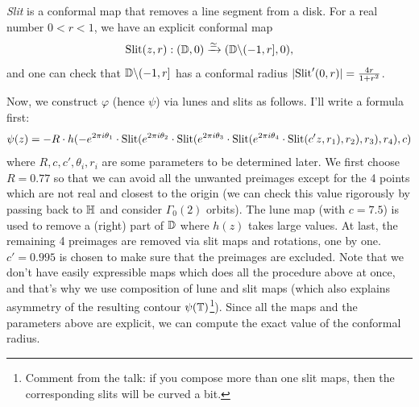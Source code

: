 \emph{Slit} is a conformal map that removes a line segment from a disk.
For a real number $0 < r < 1$, we have an explicit conformal map \cite[Equation A.3.1]{calegari2024linear}
$$
    \mathrm{Slit}(z, r) : (\mathbb{D}, 0) \xrightarrow{\simeq} (\mathbb{D} \backslash (-1, r], 0),
$$
and one can check that $\mathbb{D} \backslash (-1, r]$ has a conformal radius $|\mathrm{Slit}'(0, r)| = \frac{4r}{1 + r^2}$.

Now, we construct $\varphi$ (hence $\psi$) via lunes and slits as follows.
I'll write a formula first:
\begin{equation}
\label{eqn:psi}
    \psi(z) = -R \cdot h(-e^{2\pi i \theta_1} \cdot \mathrm{Slit} (e^{2\pi i \theta_2} \cdot \mathrm{Slit}(e^{2 \pi i \theta_3} \cdot \mathrm{Slit} (e^{2\pi i \theta_4} \cdot \mathrm{Slit} (c' z, r_1), r_2), r_3), r_4), c)
\end{equation}
where $R, c, c', \theta_i, r_i$ are some parameters to be determined later.
We first choose $R = 0.77$ so that we can avoid all the unwanted preimages except for the 4 points which are not real and closest to the origin (we can check this value rigorously by passing back to $\mathbb{H}$ and consider $\Gamma_0(2)$ orbits).
The lune map (with $c = 7.5$) is used to remove a (right) part of $\mathbb{D}$ where $h(z)$ takes large values.
At last, the remaining 4 preimages are removed via slit maps and rotations, one by one.
$c' = 0.995$ is chosen to make sure that the preimages are excluded.
Note that we don't have easily expressible maps which does all the procedure above at once, and that's why we use composition of lune and slit maps (which also explains asymmetry of the resulting contour $\psi(\mathbb{T})$\footnote{Comment from the talk: if you compose more than one slit maps, then the corresponding slits will be curved a bit.}).
Since all the maps and the parameters above are explicit, we can compute the exact value of the conformal radius.


